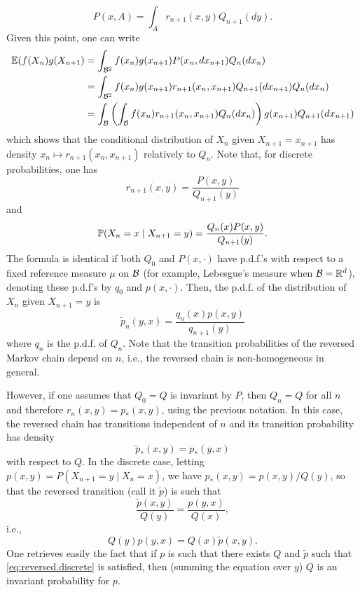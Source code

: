 \[
P(x,A) = \int_A r_{n+1}(x,y) Q_{n+1}(dy).
\]
Given this point, one can write
\begin{align*}
\bm{\mathbb E}(f(X_n) g(X_{n+1}) &= \int_{{\mathcal B}^2} f(x_n) g(x_{n+1}) P(x_n, dx_{n+1}) Q_n(dx_n) \\ 
&= \int_{{\mathcal B}^2} f(x_n) g(x_{n+1}) r_{n+1}(x_n, x_{n+1}) Q_{n+1}(dx_{n+1}) Q_n(dx_n) \\ 
&= \int_{{\mathcal B}} \left(\int_{{\mathcal B}} f(x_n)  r_{n+1}(x_n, x_{n+1}) Q_n(dx_n)\right) g(x_{n+1}) Q_{n+1}(dx_{n+1})  
\end{align*} 
which shows that the conditional distribution of $X_n$ given $X_{n+1} = x_{n+1}$ has density $x_n \mapsto r_{n+1}(x_n, x_{n+1})$ relatively to $Q_{n}$. Note that, for discrete probabilities, one has
\[
r_{n+1}(x,y) = \frac{P(x,y)}{Q_{n+1}(y)}
\]
and 
\begin{equation}
\label{eq:reversed.general}
\bm{\mathbb P}(X_n = x \mid X_{n+1}= y) = \frac{Q_n(x) P(x,y)}{Q_{n+1}(y)}.
\end{equation}
The formula is identical if both $Q_0$ and $P(x, \cdot)$ have p.d.f.'s with respect to a fixed reference measure $\mu$ on ${\mathcal B}$ (for example, Lebesgue's measure when ${\mathcal B} = {\mathbb{R}}^d$), denoting these p.d.f's by $q_0$ and $p(x, \cdot)$. Then, the p.d.f. of the  distribution of $ X_n$ given $X_{n+1}=y$ is 
\begin{equation}
\label{eq:reversed.pdf.gen}
\tilde p_n(y, x) = \frac{q_n(x) p(x,y)}{q_{n+1}(y)}
\end{equation}
where $q_n$ is the p.d.f. of $Q_n$. Note that the transition probabilities of the reversed Markov chain depend on $n$, i.e., the reversed chain is non-homogeneous in general.

However, if one assumes that $Q_0 = Q$ is invariant by $P$, then $Q_n = Q$ for all $n$ and therefore $r_n(x,y) = p_*(x,y)$, using the previous notation. In this case, the reversed chain  has transitions independent of $n$ and its transition probability has density
\[
\tilde p_*(x, y) = p_*(y, x)
\] 
with respect to $Q$. In the discrete case, letting $p(x,y) = P(X_{n+1} = y\mid X_n=x)$, we have $ p_*(x,y) = p(x,y) / Q(y)$, so that the reversed transition (call it $\tilde p$) is such that
\[
\frac{\tilde{p}(x,y)}{Q(y)} = \frac{p(y,x)}{Q(x)},
\]
i.e.,
\begin{equation}
\label{eq:reversed.discrete}
Q(y) p(y,x) = Q(x) \tilde p(x,y).
\end{equation}
One retrieves easily the fact that  if $p$ is such that there exists $Q$ and $\tilde p$ such that \cref{eq:reversed.discrete} is satisfied, then (summing the equation over $y$) $Q$ is an invariant probability for $p$. 

